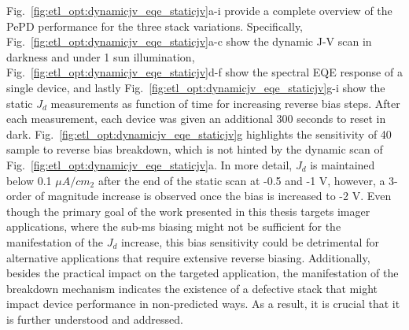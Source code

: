 Fig.~\ref{fig:etl_opt:dynamicjv_eqe_staticjv}a-i provide a complete overview of the PePD performance for the three stack variations. Specifically, Fig.~\ref{fig:etl_opt:dynamicjv_eqe_staticjv}a-c show the dynamic J-V scan in darkness and under 1 sun illumination, Fig.~\ref{fig:etl_opt:dynamicjv_eqe_staticjv}d-f show the spectral EQE response of a single device, and lastly Fig.~\ref{fig:etl_opt:dynamicjv_eqe_staticjv}g-i show the static $J_d$ measurements as function of time for increasing reverse bias steps. After each measurement, each device was given an additional 300 seconds to reset in dark. Fig.~\ref{fig:etl_opt:dynamicjv_eqe_staticjv}g highlights the sensitivity of 40 sample to reverse bias breakdown, which is not  hinted by the dynamic scan of Fig.~\ref{fig:etl_opt:dynamicjv_eqe_staticjv}a. In more detail, $J_d$ is maintained below 0.1 $\mu A/cm_2$ after the end of the static scan at -0.5 and -1 V, however, a 3-order of magnitude increase is observed once the bias is increased to -2 V. Even though the primary goal of the work presented in this thesis targets imager applications, where the sub-ms biasing might not be sufficient for the manifestation of the $J_d$ increase, this bias sensitivity could be detrimental for alternative applications that require extensive reverse biasing. Additionally, besides the practical impact on the targeted application, the manifestation of the breakdown mechanism indicates the existence of a defective stack that might impact device performance in non-predicted ways. As a result, it is crucial that it is further understood and addressed. 


